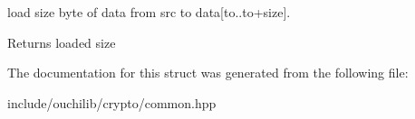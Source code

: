load size byte of data from src to data\mbox{[}to..to+size\mbox{]}. 

\begin{DoxyReturn}{Returns}
loaded size
\end{DoxyReturn}


The documentation for this struct was generated from the following file\+:\begin{DoxyCompactItemize}
\item 
include/ouchilib/crypto/common.\+hpp\end{DoxyCompactItemize}
